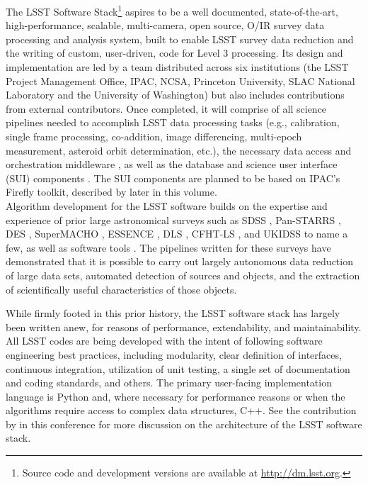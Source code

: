 \documentclass[11pt,twoside]{article}
\begin{document}
The LSST Software Stack\footnote{Source code and development versions are available at
\url{http://dm.lsst.org}.} aspires to be a well documented, state-of-the-art,
high-performance, scalable, multi-camera, open source, O/IR survey
data processing and analysis system, built to enable LSST survey data
reduction and the writing of custom, user-driven, code for Level 3
processing. Its design and implementation are led by a team distributed
across six institutions (the LSST Project Management Office, IPAC, NCSA,
Princeton University, SLAC National Laboratory and the University
of Washington) but also includes contributions from external contributors.
Once completed, it will comprise of
all science pipelines \citep{LDM-151, LDM-156} needed to accomplish LSST data processing tasks
(e.g., calibration, single frame processing, co-addition, image
differencing, multi-epoch measurement, asteroid orbit determination,
etc.), the necessary data
access and orchestration middleware \citep{LDM-152}, as well as the
database \citep{LDM-135,Wang:2011:QDS:2063348.2063364} and science user interface (SUI) components \citep{LDM-131}.
The SUI components are planned to be based on IPAC's Firefly toolkit,
described by \citet{O10-1_adassxxv} later in this volume.
\\

Algorithm development for the LSST software builds on the expertise
and experience of prior large astronomical surveys such as
SDSS \citep{2000AJ....120.1579Y},
Pan-STARRS \citep{2006amos.confE..50M,2010SPIE.7733E..0EK},
DES \citep{DESDM},
SuperMACHO \citep{2005IAUS..225..357B},
ESSENCE \citep{2007ApJ...666..674M},
DLS \citep{2002SPIE.4836...73W},
CFHT-LS \citep{2012MNRAS.427..146H, 2013MNRAS.429.2858M, 2012AJ....143...38G},
and UKIDSS \citep{2007MNRAS.379.1599L}
to name a few, as well as software tools
\citep[e.g., SExtractor,][ascl:1010.064]{1996A&AS..117..393B}.
The pipelines written for these surveys have demonstrated that it is
possible to carry out largely autonomous data reduction of large data
sets, automated detection of sources and objects, and the
extraction of scientifically useful characteristics of those objects.

While firmly footed in this prior history, the LSST software stack has
largely been written anew, for reasons of performance, extendability, and
maintainability. All LSST codes are being developed with the intent of
following software engineering best practices, including modularity, clear definition
of interfaces, continuous integration,
utilization of unit testing, a single set of documentation and coding
standards, and others. The primary user-facing implementation language is Python and, where
necessary for performance reasons or when the algorithms require access to complex data structures, C++.
See the contribution by \citet{P056_adassxxv} in this conference for
more discussion on the architecture of the LSST software stack.
\\
\end{document}
